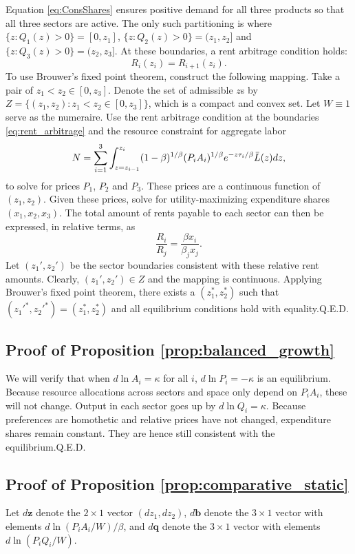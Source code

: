 \documentclass[12pt]{article}
\begin{document}
Equation \eqref{eq:ConsShares} ensures positive demand for all three products so that all three sectors are active. The only such partitioning is where $\{z: Q_1(z)>0\} = [0,z_1]$, $\{z: Q_2(z)>0\} = (z_1,z_2]$ and $\{z: Q_3(z)>0\} = (z_2,z_3]$. At these boundaries, a rent arbitrage condition holds:
\begin{equation}\label{eq:rent_arbitrage}
	R_i(z_i) = R_{i+1}(z_i).
\end{equation}
To use Brouwer's fixed point theorem, construct the following mapping. Take a pair of $z_1<z_2 \in [0,z_3]$. Denote the set of admissible $z$s by $Z=\{(z_1,z_2): z_1<z_2 \in [0,z_3]\}$, which is a compact and convex set. Let $W\equiv 1$ serve as the numeraire. Use the rent arbitrage condition at the boundaries \eqref{eq:rent_arbitrage} and the resource constraint for aggregate labor
\[
N = \sum_{i=1}^3 \int_{z=z_{i-1}}^{z_i}(1-\beta)^{1/\beta}
	(P_iA_i)^{1/\beta}
	e^{- z \tau_i/\beta}\Bar L(z)dz,
\]
to solve for prices $P_1$, $P_2$ and $P_3$. These prices are a continuous function of $(z_1,z_2)$.
Given these prices, solve for utility-maximizing expenditure shares $(x_1,x_2,x_3)$. The total amount of rents payable to each sector can then be expressed, in relative terms, as
\[
\frac {R_i}
	{R_j}
=
\frac {\beta x_i}
	{\beta_j x_j}.
\]
Let $(z_1',z_2')$ be the sector boundaries consistent with these relative rent amounts. Clearly, $(z_1',z_2')\in Z$ and the mapping is continuous. Applying Brouwer's fixed point theorem, there exists a $(z_1^*,z_2^*)$ such that $(z_1'^{*},z_2'^{*}) = (z_1^*,z_2^*)$ and all equilibrium conditions hold with equality.\hfill Q.E.D.

\subsection{Proof of Proposition \ref{prop:balanced_growth}}
We will verify that when $d\ln A_i=\kappa$ for all $i$, $d\ln P_i=-\kappa$ is an equilibrium. Because resource allocations across sectors and space only depend on $P_iA_i$, these will not change. Output in each sector goes up by $d\ln Q_i = \kappa$. Because preferences are homothetic and relative prices have not changed, expenditure shares remain constant. They are hence still consistent with the equilibrium.\hfill Q.E.D.

\subsection{Proof of Proposition \ref{prop:comparative_static}}
Let $d\mathbf z$ denote the $2\times1$ vector $(dz_1,dz_2)$, $d\mathbf b$ denote the $3\times1$ vector with elements $d\ln(P_iA_i/W)/\beta$, and $d\mathbf q$ denote the $3\times1$ vector with elements $d\ln(P_iQ_i/W)$.
\end{document}

